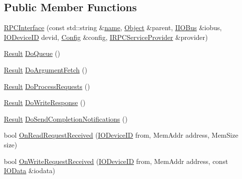 \subsection*{Public Member Functions}
\begin{DoxyCompactItemize}
\item 
\hyperlink{class_simulator_1_1_r_p_c_interface_aceaac49e6185652e6885838d5174f47d}{R\+P\+C\+Interface} (const std\+::string \&\hyperlink{mtconf_8c_a8f8f80d37794cde9472343e4487ba3eb}{name}, \hyperlink{class_simulator_1_1_object}{Object} \&parent, \hyperlink{class_simulator_1_1_i_i_o_bus}{I\+I\+O\+Bus} \&iobus, \hyperlink{namespace_simulator_a3493d987c866ad6b8aaa704c42502db0}{I\+O\+Device\+I\+D} devid, \hyperlink{class_config}{Config} \&config, \hyperlink{class_simulator_1_1_i_r_p_c_service_provider}{I\+R\+P\+C\+Service\+Provider} \&provider)
\item 
\hyperlink{namespace_simulator_a4b6b5616e7236c0c131516a441776805}{Result} \hyperlink{class_simulator_1_1_r_p_c_interface_adbc35fdda8475a7ae93aa9211783b8f2}{Do\+Queue} ()
\item 
\hyperlink{namespace_simulator_a4b6b5616e7236c0c131516a441776805}{Result} \hyperlink{class_simulator_1_1_r_p_c_interface_a1af6ff267a390c90a2a0a616cb5f2e5f}{Do\+Argument\+Fetch} ()
\item 
\hyperlink{namespace_simulator_a4b6b5616e7236c0c131516a441776805}{Result} \hyperlink{class_simulator_1_1_r_p_c_interface_a2184b38eb093586dcef716d0d2848588}{Do\+Process\+Requests} ()
\item 
\hyperlink{namespace_simulator_a4b6b5616e7236c0c131516a441776805}{Result} \hyperlink{class_simulator_1_1_r_p_c_interface_a5fdacade9b8695fd3136c8ff9039eb2d}{Do\+Write\+Response} ()
\item 
\hyperlink{namespace_simulator_a4b6b5616e7236c0c131516a441776805}{Result} \hyperlink{class_simulator_1_1_r_p_c_interface_ac603db61b25d64ada40000c9048d750c}{Do\+Send\+Completion\+Notifications} ()
\item 
bool \hyperlink{class_simulator_1_1_r_p_c_interface_ab86a5172694b00af4c51c01fc83dd296}{On\+Read\+Request\+Received} (\hyperlink{namespace_simulator_a3493d987c866ad6b8aaa704c42502db0}{I\+O\+Device\+I\+D} from, Mem\+Addr address, Mem\+Size size)
\item 
bool \hyperlink{class_simulator_1_1_r_p_c_interface_a7a8353765d3c916fbc539453c6a74ffa}{On\+Write\+Request\+Received} (\hyperlink{namespace_simulator_a3493d987c866ad6b8aaa704c42502db0}{I\+O\+Device\+I\+D} from, Mem\+Addr address, const \hyperlink{struct_simulator_1_1_i_o_data}{I\+O\+Data} \&iodata)

\end{DoxyCompactItemize}
